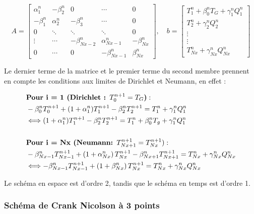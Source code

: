 \documentclass[a4paper,11pt]{article}
\begin{document}
\[
A =
\begin{bmatrix}
\alpha_1^n & -\beta_2^n & 0 & \cdots & 0 \\
-\beta_1^n & \alpha_2^n & -\beta_3^n & \cdots & 0 \\
0 & \ddots & \ddots & \ddots & 0 \\
\vdots & \cdots & -\beta_{Nx-2}^n & \alpha_{Nx-1}^n & -\beta_{Nx}^n \\
0 & \cdots & 0 & -\beta_{Nx-1}^n & \beta_{Nx}^n
\end{bmatrix}
,\quad
b =
\begin{bmatrix}
    T_1^n + \beta_{0}^n T_G + \gamma_1^nQ_1^n \\
    T_2^n + \gamma_2^nQ_2^n  \\
    \vdots \\
    \vdots \\
    T_{Nx}^n + \gamma_{Nx}^nQ_{Nx}^n 
    
\end{bmatrix}
\]

Le dernier terme de la matrice et le premier terme du second membre prennent en compte les conditions aux limites de Dirichlet et Neumann, en effet :

\begin{align*}
    &\textbf{Pour i = 1 (Dirichlet : $T_0^{n+1}=T_G$)}: \\
    &- \beta_0^n T_0^{n+1} + (1 + \alpha_1^n) T_1^{n+1} - \beta_2^n T_2^{n+1} = T_1^n + \gamma_1^n Q_1^n  \\
    & \Longleftrightarrow   (1 + \alpha_1^n) T_1^{n+1} - \beta_2^n T_2^{n+1} = T_1^n + \beta_0^n T_g + \gamma_1^n Q_1^n  \\
    &\\
    &\textbf{Pour i = Nx (Neumann: $ T_{Nx+1}^{n+1} = T_{Nx}^{n+1}$}): \\
    & - \beta_{Nx-1}^n T_{Nx-1}^{n+1} + \left(1 + \alpha_{Nx}^n\right) T_{Nx}^{n+1} -  \beta_{Nx+1}^n T_{Nx+1}^{n+1} = T_{Nx}^n + \gamma_{Nx}^n Q_{Nx}^n \\
    & \Longleftrightarrow - \beta_{Nx-1}^n T_{Nx-1}^{n+1} + \left(1 +\beta_{Nx}^n \right) T_{Nx}^{n+1} = T_{Nx}^n + \gamma_{Nx}^n Q_{Nx}^n
\end{align*}

Le schéma en espace est d'ordre 2, tandis que le schéma en temps est d'ordre 1.


\subsubsection*{Schéma de Crank Nicolson à 3 points}
\end{document}
